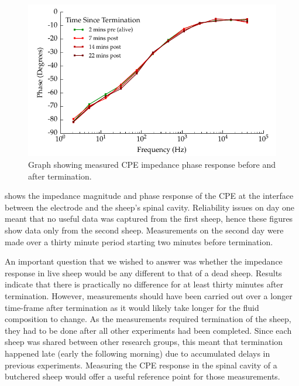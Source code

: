     \begin{figure}
      \centering
      \includegraphics{content/pt2/08-InterfaceParameters/graphics/graph_Day2_Sheep_CPE_ImpedancePhase}
      \caption{\label{fig:graph_Day2_Sheep_CPE_ImpedancePhase} Graph showing measured CPE impedance phase response before and after termination.}
    \end{figure}


     shows the impedance magnitude and phase response of the CPE at the interface between the electrode and the sheep's spinal cavity.
    Reliability issues on day one meant that no useful data was captured from the first sheep, hence these figures show data only from the second sheep.
    Measurements on the second day were made over a thirty minute period starting two minutes before termination.

    An important question that we wished to answer was whether the impedance response in live sheep would be any different to that of a dead sheep.
    Results indicate that there is practically no difference for at least thirty minutes after termination.
    However, measurements should have been carried out over a longer time-frame after termination as it would likely take longer for the fluid composition to change.
    As the measurements required termination of the sheep, they had to be done after all other experiments had been completed.
    Since each sheep was shared between other research groups, this meant that termination happened late (early the following morning) due to accumulated delays in previous experiments.
    Measuring the CPE response in the spinal cavity of a butchered sheep would offer a useful reference point for those measurements.


